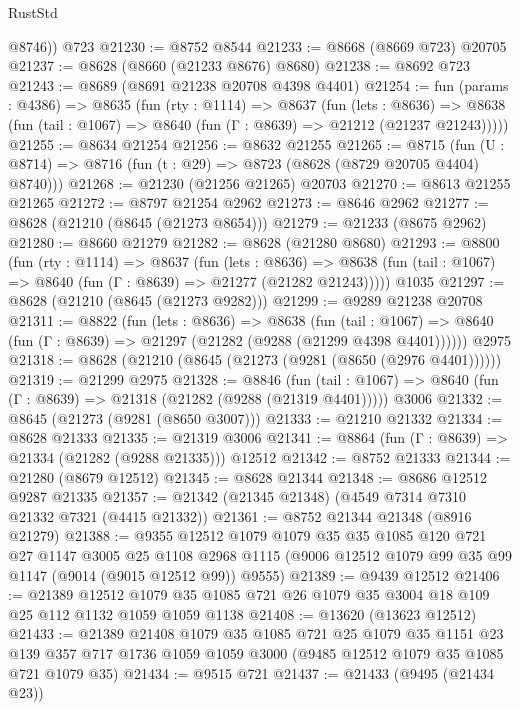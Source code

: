\begin{lexlean}{RustStd}
\begin{coremodule}
        @8746))
    @723
@21230 := @8752 @8544
@21233 := @8668 (@8669 @723) @20705
@21237 := @8628 (@8660 (@21233 @8676) @8680)
@21238 := @8692 @723
@21243 := @8689 (@8691 @21238 @20708 @4398 @4401)
@21254 := fun (params : @4386) =>
  @8635
    (fun (rty : @1114) =>
    @8637
      (fun (lets : @8636) =>
      @8638 (fun (tail : @1067) => @8640 (fun (Γ : @8639) => @21212 (@21237 @21243)))))
@21255 := @8634 @21254
@21256 := @8632 @21255
@21265 := @8715
    (fun (U : @8714) => @8716 (fun (t : @29) => @8723 (@8628 (@8729 @20705 @4404) @8740)))
@21268 := @21230 (@21256 @21265) @20703
@21270 := @8613 @21255 @21265
@21272 := @8797 @21254 @2962
@21273 := @8646 @2962
@21277 := @8628 (@21210 (@8645 (@21273 @8654)))
@21279 := @21233 (@8675 @2962)
@21280 := @8660 @21279
@21282 := @8628 (@21280 @8680)
@21293 := @8800
    (fun (rty : @1114) =>
    @8637
      (fun (lets : @8636) =>
      @8638 (fun (tail : @1067) => @8640 (fun (Γ : @8639) => @21277 (@21282 @21243)))))
    @1035
@21297 := @8628 (@21210 (@8645 (@21273 @9282)))
@21299 := @9289 @21238 @20708
@21311 := @8822
    (fun (lets : @8636) =>
    @8638
      (fun (tail : @1067) =>
      @8640 (fun (Γ : @8639) => @21297 (@21282 (@9288 (@21299 @4398 @4401))))))
    @2975
@21318 := @8628 (@21210 (@8645 (@21273 (@9281 (@8650 (@2976 @4401))))))
@21319 := @21299 @2975
@21328 := @8846
    (fun (tail : @1067) => @8640 (fun (Γ : @8639) => @21318 (@21282 (@9288 (@21319 @4401)))))
    @3006
@21332 := @8645 (@21273 (@9281 (@8650 @3007)))
@21333 := @21210 @21332
@21334 := @8628 @21333
@21335 := @21319 @3006
@21341 := @8864 (fun (Γ : @8639) => @21334 (@21282 (@9288 @21335))) @12512
@21342 := @8752 @21333
@21344 := @21280 (@8679 @12512)
@21345 := @8628 @21344
@21348 := @8686 @12512 @9287 @21335
@21357 := @21342 (@21345 @21348) (@4549 @7314 @7310 @21332 @7321 (@4415 @21332))
@21361 := @8752 @21344 @21348 (@8916 @21279)
@21388 := @9355
    @12512
    @1079
    @1079
    @35
    @35
    @1085
    @120
    @721
    @27
    @1147
    @3005
    @25
    @1108
    @2968
    @1115
    (@9006 @12512 @1079 @99 @35 @99 @1147 (@9014 (@9015 @12512 @99)) @9555)
@21389 := @9439 @12512
@21406 := @21389
    @12512
    @1079
    @35
    @1085
    @721
    @26
    @1079
    @35
    @3004
    @18
    @109
    @25
    @112
    @1132
    @1059
    @1059
    @1138
@21408 := @13620 (@13623 @12512)
@21433 := @21389
    @21408
    @1079
    @35
    @1085
    @721
    @25
    @1079
    @35
    @1151
    @23
    @139
    @357
    @717
    @1736
    @1059
    @1059
    @3000
    (@9485 @12512 @1079 @35 @1085 @721 @1079 @35)
@21434 := @9515 @721
@21437 := @21433 (@9495 (@21434 @23))

\end{coremodule}
\end{lexlean}
